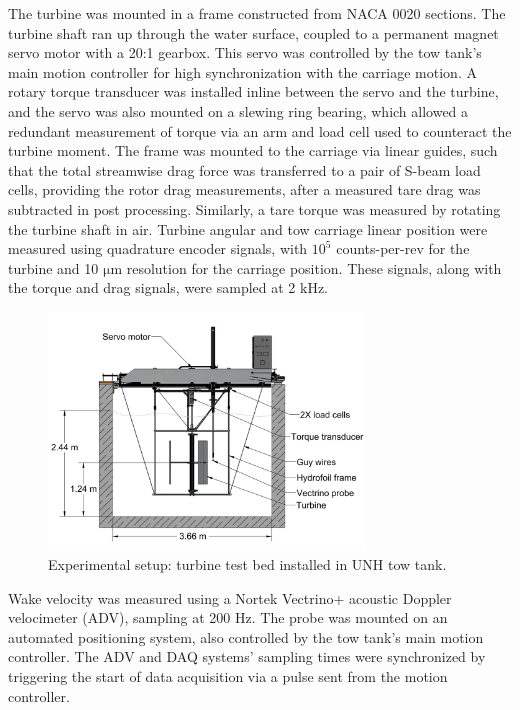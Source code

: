 \documentclass[energies,article,accept,moreauthors,pdftex,12pt,a4paper]{mdpi}
\begin{document}
The turbine was mounted in a frame constructed from NACA 0020 sections. The
turbine shaft ran up through the water surface, coupled to a permanent magnet
servo motor with a 20:1 gearbox. This servo was controlled by the tow tank's
main motion controller for high synchronization with the carriage motion. A
rotary torque transducer was installed inline between the servo and the turbine,
and the servo was also mounted on a slewing ring bearing, which allowed a
redundant measurement of torque via an arm and load cell used to counteract the
turbine moment. The frame was mounted to the carriage via linear guides, such
that the total streamwise drag force was transferred to a pair of S-beam load
cells, providing the rotor drag measurements, after a measured tare drag was
subtracted in post processing. Similarly, a tare torque was measured by rotating
the turbine shaft in air. Turbine angular and tow carriage linear position were
measured using quadrature encoder signals, with $10^5$ counts-per-rev for the
turbine and 10 $\mathrm{\mu m}$ resolution for the carriage position. These
signals, along with the torque and drag signals, were sampled at 2 kHz.

\begin{figure}[ht!]
\centering
\includegraphics[width=0.75\textwidth]{figures/exp_setup_drawing}
\caption{Experimental setup: turbine test bed installed in UNH tow tank.}
\label{fig:exp-setup}
\end{figure}

Wake velocity was measured using a Nortek Vectrino+ acoustic Doppler velocimeter
(ADV), sampling at 200 Hz. The probe was mounted on an automated positioning
system, also controlled by the tow tank's main motion controller. The ADV and
DAQ systems' sampling times were synchronized by triggering the start of data
acquisition via a pulse sent from the motion controller.
\end{document}
